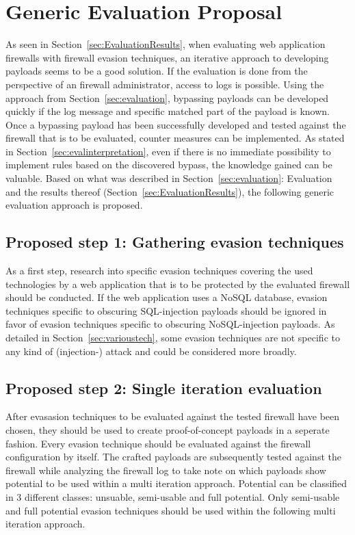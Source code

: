 \section{Generic Evaluation Proposal}
\label{sec:proposal}
As seen in Section~\ref{sec:EvaluationResults}, when evaluating web application firewalls with firewall evasion techniques, an iterative approach to developing payloads seems to be a good solution. If the evaluation is done from the perspective of an firewall administrator, access to logs is possible. Using the approach from Section~\ref{sec:evaluation}, bypassing payloads can be developed quickly if the log message and specific matched part of the payload is known. Once a bypassing payload has been successfully developed and tested against the firewall that is to be evaluated, counter measures can be implemented. As stated in Section~\ref{sec:evalinterpretation}, even if there is no immediate possibility to implement rules based on the discovered bypass, the knowledge gained can be valuable. Based on what was described in Section~\ref{sec:evaluation}: Evaluation and the results thereof (Section~\ref{sec:EvaluationResults}), the following generic evaluation approach is proposed.

\subsection{Proposed step 1: Gathering evasion techniques}
As a first step, research into specific evasion techniques covering the used technologies by a web application that is to be protected by the evaluated firewall should be conducted. If the web application uses a NoSQL database, evasion techniques specific to obscuring SQL-injection payloads should be ignored in favor of evasion techniques specific to obscuring NoSQL-injection payloads. As detailed in Section~\ref{sec:varioustech}, some evasion techniques are not specific to any kind of (injection-) attack and could be considered more broadly.

\subsection{Proposed step 2: Single iteration evaluation}
After evasasion techniques to be evaluated against the tested firewall have been chosen, they should be used to create proof-of-concept payloads in a seperate fashion. Every evasion technique should be evaluated against the firewall configuration by itself. The crafted payloads are subsequently tested against the firewall while analyzing the firewall log to take note on which payloads show potential to be used within a multi iteration approach. Potential can be classified in 3 different classes: unsuable, semi-usable and full potential. Only semi-usable and full potential evasion techniques should be used within the following multi iteration approach.

